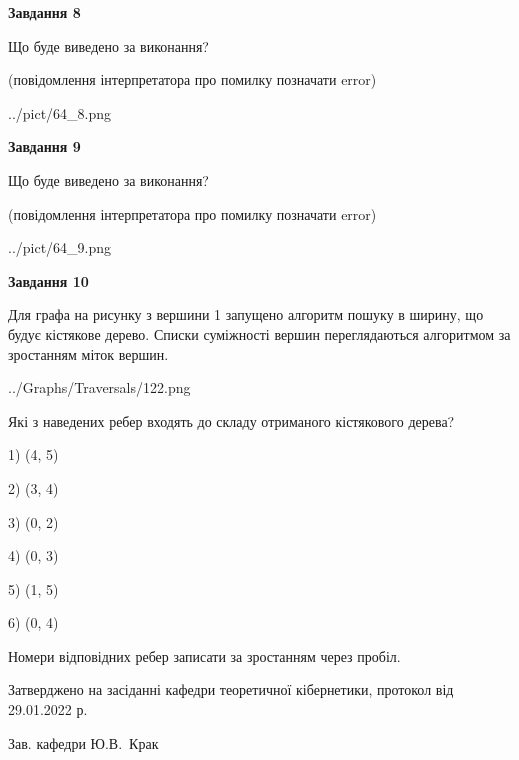 \documentclass[12pt, ukrainian]{article}
\begin{document}
{\begin {large}
{\begin {center}\textbf{Завдання 8}\end {center}}\par
Що буде виведено за виконання?\par
 (повідомлення інтерпретатора про помилку позначати error)\par
\begin{center}
	{../pict/64_8.png}
\end{center}
\newpage

{\begin {center}\textbf{Завдання 9}\end {center}}\par
Що буде виведено за виконання?\par
 (повідомлення інтерпретатора про помилку позначати error)\par
\begin{center}
	{../pict/64_9.png}
\end{center}
\newpage

{\begin {center}\textbf{Завдання 10}\end {center}}\par
Для графа на рисунку з вершини 1 запущено алгоритм пошуку в ширину, що будує кістякове дерево. Списки суміжності вершин переглядаються алгоритмом за зростанням міток вершин.\par
\begin{center}
	{../Graphs/Traversals/122.png}
\end{center}
\par Які з наведених ребер входять до складу отриманого кістякового дерева?\par
1) (4, 5)\par
2) (3, 4)\par
3) (0, 2)\par
4) (0, 3)\par
5) (1, 5)\par
6) (0, 4)\par
{\vskip 15pt} Номери відповідних ребер записати за зростанням через пробіл.\par
\newpage


\end {large}
}
{\smallskip \begin {small} Затверджено на засіданні кафедри теоретичної кібернетики, протокол  від   29.01.2022 р.\par\smallskip\smallskip
{\parbox {6.5 cm}{Зав. кафедри \dotfill Ю.В.~Крак}} \end{small}}
\end{document}
